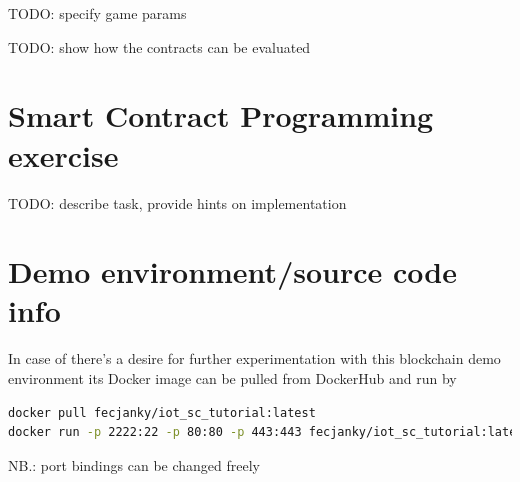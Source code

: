 \documentclass[a4paper]{article}
\begin{document}
TODO: specify game params

TODO: show how the contracts can be evaluated

\section{Smart Contract Programming exercise}

TODO: describe task, provide hints on implementation

\section{Demo environment/source code info}

In case of there's a desire for further experimentation with this blockchain demo environment its Docker image can be pulled from DockerHub and run by 

\begin{lstlisting}[language=bash]
docker pull fecjanky/iot_sc_tutorial:latest
docker run -p 2222:22 -p 80:80 -p 443:443 fecjanky/iot_sc_tutorial:latest
\end{lstlisting}

NB.: port bindings can be changed freely
\end{document}

